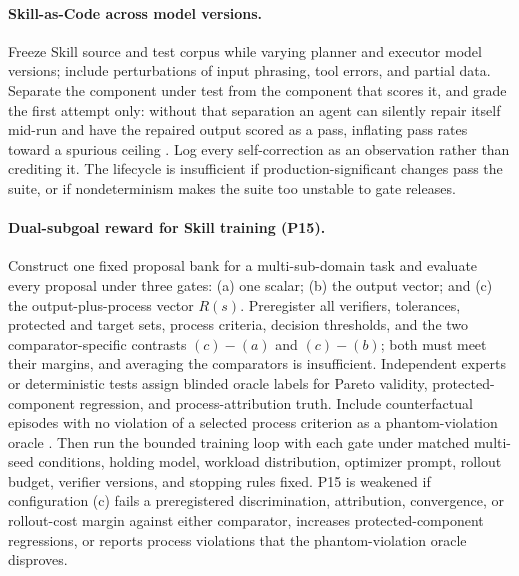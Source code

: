 \paragraph{Skill-as-Code across model versions.}
Freeze Skill source and test corpus while varying planner and executor model versions; include perturbations of input phrasing, tool errors, and partial data. Separate the component under test from the component that scores it, and grade the first attempt only: without that separation an agent can silently repair itself mid-run and have the repaired output scored as a pass, inflating pass rates toward a spurious ceiling \cite{anand2026aeval}. Log every self-correction as an observation rather than crediting it. The lifecycle is insufficient if production-significant changes pass the suite, or if nondeterminism makes the suite too unstable to gate releases.

\paragraph{Dual-subgoal reward for Skill training (P15).}
Construct one fixed proposal bank for a multi-sub-domain task and evaluate every proposal under three gates: (a) one scalar; (b) the output vector; and (c) the output-plus-process vector $R(s)$. Preregister all verifiers, tolerances, protected and target sets, process criteria, decision thresholds, and the two comparator-specific contrasts $(c)-(a)$ and $(c)-(b)$; both must meet their margins, and averaging the comparators is insufficient. Independent experts or deterministic tests assign blinded oracle labels for Pareto validity, protected-component regression, and process-attribution truth. Include counterfactual episodes with no violation of a selected process criterion as a phantom-violation oracle \cite{wang2026phantom}. Then run the bounded training loop with each gate under matched multi-seed conditions, holding model, workload distribution, optimizer prompt, rollout budget, verifier versions, and stopping rules fixed. P15 is weakened if configuration (c) fails a preregistered discrimination, attribution, convergence, or rollout-cost margin against either comparator, increases protected-component regressions, or reports process violations that the phantom-violation oracle disproves.

